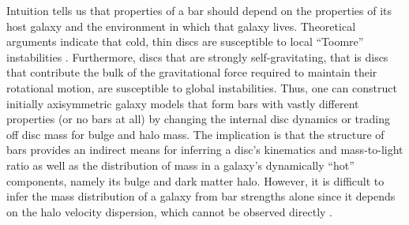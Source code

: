 
Intuition tells us that properties of a bar should depend on the
properties of its host galaxy and the environment in which that
galaxy lives.  Theoretical arguments indicate that cold, thin discs
are susceptible to local ``Toomre'' instabilities {\citep{BT}}.  
Furthermore, discs that are strongly self-gravitating, that is discs that 
contribute the bulk of the gravitational force required to maintain their rotational
motion, are susceptible to global instabilities.  Thus, one can
construct initially axisymmetric galaxy models that form bars with
vastly different properties (or no bars at all) by changing the
internal disc dynamics or trading off disc mass for bulge and halo
mass.  The implication is that the {structure of bars} provides an
indirect means for inferring a disc's kinematics and mass-to-light
ratio as well as the distribution of mass in a galaxy's dynamically
``hot'' components, namely its bulge and dark matter halo. {However,
it is difficult to infer the mass distribution of a galaxy from bar
strengths alone since it depends on the halo velocity dispersion, 
which cannot be observed directly \citep{athanassoula_2003}.}


